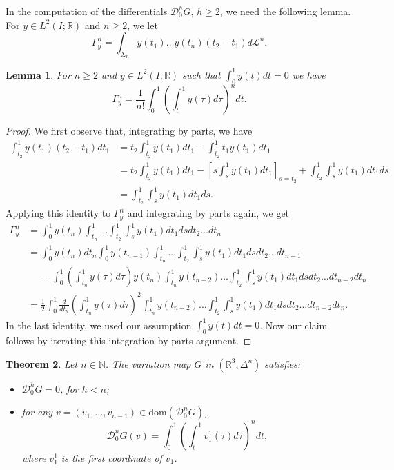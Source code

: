 \documentclass[12pt, reqno]{amsart}
\theoremstyle{plain}
\newtheorem {theorem}{Theorem}[section]
\newtheorem {lemma}[theorem]{Lemma}
\theoremstyle{definition}
\theoremstyle{remark}
\numberwithin{equation}{section}
\newcommand{\R}{\mathbb{R}}
\newcommand{\N}{\mathbb{N}}
\newcommand{\D}{\mathcal{D}}
\renewcommand{\L}{\mathcal{L}}
\newcommand{\0}{\theta}
\newcommand{\De}{\Delta}
\newcommand{\1}{{-1}}
\newcommand{\Ga}{\Gamma}
\newcommand{\m}{n}
\renewcommand{\=}{\coloneqq}
\renewcommand{\.}{\dots}
\newcommand{\dom}{\mathrm{dom}}
\begin{document}
In  the computation of the differentials $\D_0^hG$, $h\geq 2$, we need the following lemma. For $y\in L^2(I;\R)$ and $n\geq 2$,
we let  
\begin{equation}
 \label{Iy}
 \Ga_y^n=\int_{\Sigma_n} y(t_1)\.y(t_n)(t_2-t_1)d\L^{n}.
\end{equation}


\begin{lemma}
 \label{lemma102}
 For  $n\geq 2$ and  $y\in L^2(I;\R)$   such that $\displaystyle\int_0^1 y(t)dt=0$ we have 
 \begin{equation}
 \label{segno}
 \Ga_y^n=\frac{1}{n!}\int_{0}^1\left(\int_{t}^1y(\tau)d\tau\right)^ndt.
\end{equation}
\end{lemma}


\begin{proof}
  We first observe that, integrating by parts, we have
 \begin{align*}
  \int_{t_2}^1y(t_1)(t_2-t_1)dt_1&=t_2\int_{t_2}^1y(t_1)dt_1-\int_{t_2}^1t_1y(t_1)dt_1\\
  &=t_2\int_{t_2}^1y(t_1)dt_1-\left[s\int_{s}^1y(t_1)dt_1\right]_{s=t_2}+\int_{t_2}^1\int_{s}^1y(t_1)dt_1ds\\
  &=\int_{t_2}^1\int_{s}^1y(t_1)dt_1ds.
 \end{align*}
 Applying this identity to $\Ga_y^n$ and integrating by parts again, we get
 \begin{align*}
  \Ga_y^n&=\int_{0}^1y(t_n)\int_{t_n}^1\dots\int_{t_2}^1\int_s^1y(t_1)dt_1dsdt_2\.dt_n\\
  &=\int_{0}^1y(t_n)dt_n \int_{0}^1y(t_{n-1})\int_{t_n}^1\dots\int_{t_2}^1\int_s^1y(t_1)dt_1dsdt_2\.dt_{n-1}\\
  &\quad\;-\int_{0}^1\left(\int_{t_n}^1y(\tau)d\tau\right) y(t_{n})\int_{t_n}^1y(t_{n-2})\dots\int_{t_2}^1\int_s^1y(t_1)dt_1dsdt_2\.dt_{n-2}dt_n\\
  &=\frac{1}{2}\int_{0}^1\frac{d}{d t_n}\left(\int_{t_n}^1y(\tau)d\tau\right)^2\int_{t_n}^1y(t_{n-2})\dots\int_{t_2}^1\int_s^1y(t_1)dt_1dsdt_2\.dt_{n-2}dt_n.
 \end{align*}
 In the last identity, we used our assumption $\displaystyle \int_0^1 y(t)dt=0$.
Now our claim follows by iterating this   integration by parts argument.
\end{proof}









\begin{theorem}
 \label{teo103}
 Let $n\in\N$. The variation map $G$ in $(\R^3,\De^n)$ satisfies:
 \begin{itemize}
  \item[i)]  $\D_0^hG=0$, for $ h<\m$;
  \item[ii)] for any $v=(v_1,\.,v_{n-1})\in\dom(\D_0^nG)$,
  \begin{equation}
  \label{eqDn} \D_0^nG(v)= \int_0^1\left(\int_t^1 v_1^1(\tau)d\tau\right)^n dt,
  \end{equation}
  where $v_1^1$ is the first coordinate of $v_1$.
 \end{itemize}
\end{theorem}
\end{document}
